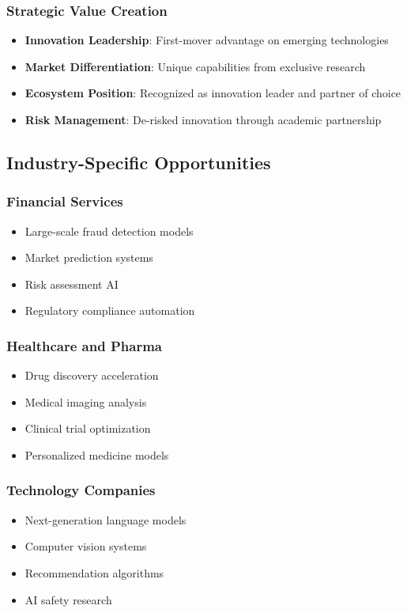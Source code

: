 \subsubsection{Strategic Value Creation}
\begin{itemize}
\item \textbf{Innovation Leadership}: First-mover advantage on emerging technologies
\item \textbf{Market Differentiation}: Unique capabilities from exclusive research
\item \textbf{Ecosystem Position}: Recognized as innovation leader and partner of choice
\item \textbf{Risk Management}: De-risked innovation through academic partnership
\end{itemize}

\subsection{Industry-Specific Opportunities}

\subsubsection{Financial Services}
\begin{itemize}
\item Large-scale fraud detection models
\item Market prediction systems
\item Risk assessment AI
\item Regulatory compliance automation
\end{itemize}

\subsubsection{Healthcare and Pharma}
\begin{itemize}
\item Drug discovery acceleration
\item Medical imaging analysis
\item Clinical trial optimization
\item Personalized medicine models
\end{itemize}

\subsubsection{Technology Companies}
\begin{itemize}
\item Next-generation language models
\item Computer vision systems
\item Recommendation algorithms
\item AI safety research
\end{itemize}

